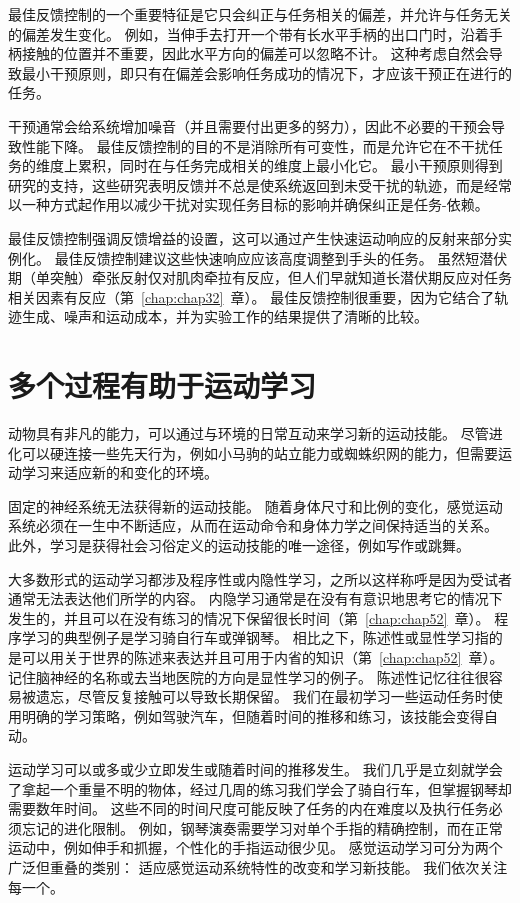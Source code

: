 最佳反馈控制的一个重要特征是它只会纠正与任务相关的偏差，并允许与任务无关的偏差发生变化。
例如，当伸手去打开一个带有长水平手柄的出口门时，沿着手柄接触的位置并不重要，因此水平方向的偏差可以忽略不计。
这种考虑自然会导致最小干预原则，即只有在偏差会影响任务成功的情况下，才应该干预正在进行的任务。


干预通常会给系统增加噪音（并且需要付出更多的努力），因此不必要的干预会导致性能下降。
最佳反馈控制的目的不是消除所有可变性，而是允许它在不干扰任务的维度上累积，同时在与任务完成相关的维度上最小化它。
最小干预原则得到研究的支持，这些研究表明反馈并不总是使系统返回到未受干扰的轨迹，而是经常以一种方式起作用以减少干扰对实现任务目标的影响并确保纠正是任务-依赖。


最佳反馈控制强调反馈增益的设置，这可以通过产生快速运动响应的反射来部分实例化。
最佳反馈控制建议这些快速响应应该高度调整到手头的任务。
虽然短潜伏期（单突触）牵张反射仅对肌肉牵拉有反应，但人们早就知道长潜伏期反应对任务相关因素有反应（第~\ref{chap:chap32}~章）。
最佳反馈控制很重要，因为它结合了轨迹生成、噪声和运动成本，并为实验工作的结果提供了清晰的比较。



\section{多个过程有助于运动学习}

动物具有非凡的能力，可以通过与环境的日常互动来学习新的运动技能。
尽管进化可以硬连接一些先天行为，例如小马驹的站立能力或蜘蛛织网的能力，但需要运动学习来适应新的和变化的环境。


固定的神经系统无法获得新的运动技能。
随着身体尺寸和比例的变化，感觉运动系统必须在一生中不断适应，从而在运动命令和身体力学之间保持适当的关系。
此外，学习是获得社会习俗定义的运动技能的唯一途径，例如写作或跳舞。


大多数形式的运动学习都涉及程序性或内隐性学习，之所以这样称呼是因为受试者通常无法表达他们所学的内容。
内隐学习通常是在没有有意识地思考它的情况下发生的，并且可以在没有练习的情况下保留很长时间（第~\ref{chap:chap52}~章）。
程序学习的典型例子是学习骑自行车或弹钢琴。 相比之下，陈述性或显性学习指的是可以用关于世界的陈述来表达并且可用于内省的知识（第~\ref{chap:chap52}~章）。
记住脑神经的名称或去当地医院的方向是显性学习的例子。
陈述性记忆往往很容易被遗忘，尽管反复接触可以导致长期保留。
我们在最初学习一些运动任务时使用明确的学习策略，例如驾驶汽车，但随着时间的推移和练习，该技能会变得自动。


运动学习可以或多或少立即发生或随着时间的推移发生。
我们几乎是立刻就学会了拿起一个重量不明的物体，经过几周的练习我们学会了骑自行车，但掌握钢琴却需要数年时间。
这些不同的时间尺度可能反映了任务的内在难度以及执行任务必须忘记的进化限制。
例如，钢琴演奏需要学习对单个手指的精确控制，而在正常运动中，例如伸手和抓握，个性化的手指运动很少见。
感觉运动学习可分为两个广泛但重叠的类别：
适应感觉运动系统特性的改变和学习新技能。
我们依次关注每一个。



